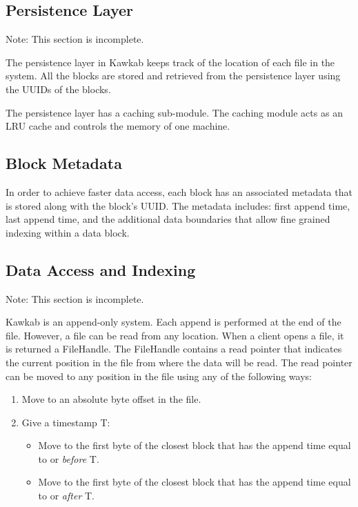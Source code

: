 \documentclass[]{article}
\newcommand{\hl}[1]{\textcolor{notecolor}{#1}}
\begin{document}
\subsection{Persistence Layer}
\hl{Note: This section is incomplete.}

The persistence layer in Kawkab keeps track of the location of each file in the system.
All the blocks are stored and retrieved from the persistence layer using the UUIDs
of the blocks.

The persistence layer has a caching sub-module. The caching module acts as an
LRU cache and controls the memory of one machine.


\subsection{Block Metadata} In order to achieve faster data access, each block
has an associated metadata that is stored along with the block's UUID. The
metadata includes: first append time, last append time, and the additional
data boundaries that allow fine grained indexing within a data block.

\subsection{Data Access and Indexing}
\hl{Note: This section is incomplete.}

Kawkab is an append-only system. Each append is performed at the end of the file.
However, a file can be read from any location. When a client opens a file,
it is returned a FileHandle. The FileHandle contains a read pointer that indicates
the current position in the file from where the data will be read. The read
pointer can be moved to any position in the file using any of the following
ways: 

\begin{enumerate}
  \item Move to an absolute byte offset in the file.
  \item Give a timestamp T:
  \begin{itemize}
    \item Move to the first byte of the closest block that has the append time equal to
          or \textit{before} T.
    \item Move to the first byte of the closest block that has the append time equal to
          or \textit{after} T.
  \end{itemize}
\end{enumerate}
\end{document}
